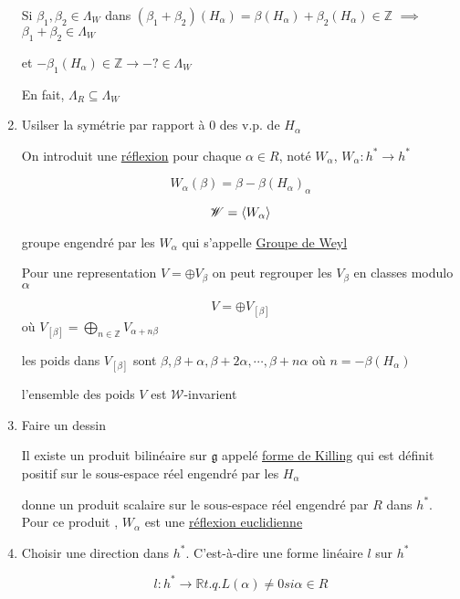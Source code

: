 \begin{enumerate}[label=\textbf{Étape \arabic*:}]
Si \(\beta_1 , \beta_2 \in \Lambda_W \) dans \((\beta_1 +\beta_2 ) (H_{\alpha} ) = \beta(H_{\alpha} ) + \beta_2 (H_{\alpha} ) \in \mathds{Z}\) \(\implies\) \(\beta_1 + \beta_2 \in \Lambda_W\)

et \(-\beta_1 (H_\alpha) \in \mathds{Z} \to -? \in \Lambda_W\)

En fait, \( \Lambda_R \subseteq \Lambda_W \)


\item Usilser la symétrie par rapport à 0 des v.p. de \(H_{\alpha} \)

On introduit une \underline{réflexion} pour chaque \(\alpha \in R\), noté \(W_{\alpha} \), \(W_{\alpha} : h^{*} \to h ^{*}\) 

\[ W_{\alpha} (\beta) = \beta - \beta(H_{\alpha} )_\alpha  \]

\[ \mathscr{W} = \expval{W_{\alpha} } \]

groupe engendré par les \(W_{\alpha} \) qui s'appelle \underline{Groupe de Weyl} 

Pour une representation \(V = \oplus V_{\beta} \) on peut regrouper les \(V_{\beta} \) en classes modulo \(\alpha\)


\[ V = \oplus V_{[\beta]}  \]où \(V_{[\beta]} = \bigoplus_{n \in \mathds{Z}} V_{\alpha+n\beta} \)

les poids dans \(V_{[\beta]} \) sont \(\beta , \beta + \alpha , \beta + 2 \alpha , \dotsb , \beta + n\alpha\) 
où \(n = -\beta(H_{\alpha} )\)


\begin{tcolorbox}[title=Conclusion]
	l'ensemble des poids \( V\) est \(\mathscr{W}\)-invarient
\end{tcolorbox}

\item Faire un dessin

Il existe un produit bilinéaire sur \(\mathfrak{g}\) appelé \underline{forme de Killing} qui est définit positif sur le sous-espace réel engendré par les \(H_{\alpha} \)

donne un produit scalaire sur le sous-espace réel engendré par \(R\) dans \(h^{*}\). Pour ce produit , \(W_{\alpha} \) est une \underline{réflexion euclidienne } 

\item Choisir une direction dans \(h^{*}\). C'est-à-dire une forme linéaire \(l\) sur \(h^{*}\) 

	\[ l: h^{*} \to \mathds{R} t.q. L(\alpha) \neq 0 si \alpha \in R\]


\end{enumerate}

